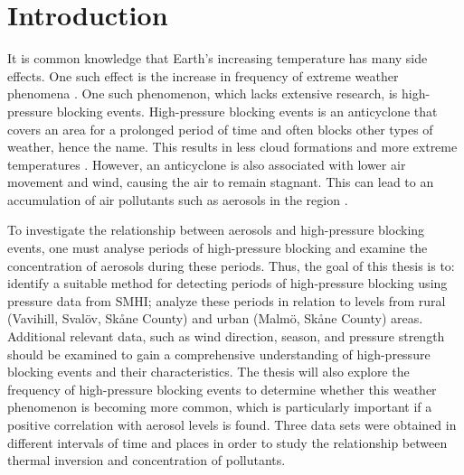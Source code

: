 \section{Introduction}
It is common knowledge that Earth's increasing temperature has many side effects. One such effect is the increase in frequency of extreme weather phenomena \cite{mitchellExtremeEventsDue2006}. One such phenomenon, which lacks extensive research, is high-pressure blocking events. High-pressure blocking events is an anticyclone that covers an area for a prolonged period of time and often blocks other types of weather, hence the name. This results in less cloud formations and more extreme temperatures \cite{lupoAtmosphericBlockingEvents2020}. However, an anticyclone is also associated with lower air movement and wind, causing the air to remain stagnant. This can lead to an accumulation of air pollutants such as aerosols in the region \cite{caiImpactBlockingStructure2020}.

To investigate the relationship between aerosols and high-pressure blocking events, one must analyse periods of high-pressure blocking and examine the concentration of aerosols during these periods. Thus, the goal of this thesis is to: identify a suitable method for detecting periods of high-pressure blocking using pressure data from SMHI; analyze these periods in relation to \PM levels from rural (Vavihill, Svalöv, Skåne County) and urban (Malmö, Skåne County) areas. Additional relevant data, such as wind direction, season, and pressure strength should be examined to gain a comprehensive understanding of high-pressure blocking events and their characteristics. The thesis will also explore the frequency of high-pressure blocking events to determine whether this weather phenomenon is becoming more common, which is particularly important if a positive correlation with aerosol levels is found. Three data sets were obtained in different intervals of time and places in order to study the relationship between thermal inversion and concentration of pollutants.
